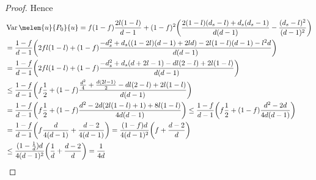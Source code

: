 \documentclass[pra,twocolumn,superscriptaddress,longbibliography]{revtex4-2}
\theoremstyle{remark}
\newcommand{\mbb}{\mathbb}
\DeclareMathOperator{\tr}{Tr}
\DeclareMathOperator{\var}{\mathrm{Var}}
\numberwithin{equation}{section}
\begin{document}
\begin{proof}
Hence 
\begin{align*}
& \var\melem{u}{P_0}{u}
= f(1-f)\frac{2l(1-l)}{d-1}
+ (1-f)^2\bigg(\frac{2(1-l)(d_s-l) + d_s(d_s-1)}{d(d-1)} - \frac{(d_s-l)^2}{(d-1)^2}\bigg) \\
& = \frac{1-f}{d-1}\bigg( 2fl(1-l)
+ (1-f)\frac{-d_s^2 + d_s((1-2l)(d-1) + 2ld) -2l(1-l)(d-1) - l^2d}{d(d-1)}\bigg) \\
& = \frac{1-f}{d-1}\bigg( 2fl(1-l) 
+ (1-f)\frac{-d_s^2 + d_s(d+2l-1) - dl(2-l)+ 2l(1-l)}{d(d-1)}\bigg) \\
& \le \frac{1-f}{d-1}\bigg( f\frac{1}{2}
+ (1-f)\frac{\frac{d^2}{4} + \frac{d(2l-1)}{2} - dl(2-l)+ 2l(1-l)}{d(d-1)}\bigg) \\
& = \frac{1-f}{d-1}\bigg( f\frac{1}{2}
+ (1-f)\frac{d^2 - 2d(2l(1-l)+1) + 8l(1-l)}{4d(d-1)}\bigg)
\le \frac{1-f}{d-1}\bigg( f\frac{1}{2}
+ (1-f)\frac{d^2 - 2d}{4d(d-1)}\bigg) \\
& = \frac{1-f}{d-1}\bigg( f\frac{d}{4(d-1)}
+ \frac{d - 2}{4(d-1)}\bigg) 
= \frac{(1-f)d}{4(d-1)^2}\bigg( f + \frac{d - 2}{d}\bigg) \\
& \le \frac{(1-\frac{1}{d})d}{4(d-1)^2}\bigg( \frac{1}{d} + \frac{d - 2}{d}\bigg) 
= \frac{1}{4d}\\
\end{align*}

\end{proof}

\end{document}

